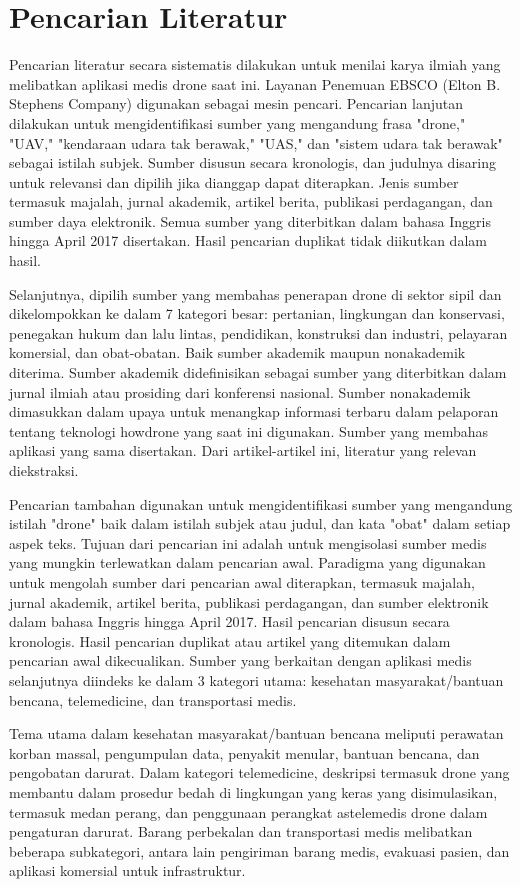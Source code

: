 \section{Pencarian Literatur}
\label{sec:pencarianliteratur}

Pencarian literatur secara sistematis dilakukan untuk menilai karya ilmiah yang melibatkan aplikasi medis drone saat ini. Layanan Penemuan EBSCO (Elton B. Stephens Company) digunakan sebagai mesin pencari. Pencarian lanjutan dilakukan untuk mengidentifikasi sumber yang mengandung frasa "drone," "UAV," "kendaraan udara tak berawak," "UAS," dan "sistem udara tak berawak" sebagai istilah subjek. Sumber disusun secara kronologis, dan judulnya disaring untuk relevansi dan dipilih jika dianggap dapat diterapkan. Jenis sumber termasuk majalah, jurnal akademik, artikel berita, publikasi perdagangan, dan sumber daya elektronik. Semua sumber yang diterbitkan dalam bahasa Inggris hingga April 2017 disertakan. Hasil pencarian duplikat tidak diikutkan dalam hasil.

Selanjutnya, dipilih sumber yang membahas penerapan drone di sektor sipil dan dikelompokkan ke dalam 7 kategori besar: pertanian, lingkungan dan konservasi, penegakan hukum dan lalu lintas, pendidikan, konstruksi dan industri, pelayaran komersial, dan obat-obatan. Baik sumber akademik maupun nonakademik diterima. Sumber akademik didefinisikan sebagai sumber yang diterbitkan dalam jurnal ilmiah atau prosiding dari konferensi nasional. Sumber nonakademik dimasukkan dalam upaya untuk menangkap informasi terbaru dalam pelaporan tentang teknologi howdrone yang saat ini digunakan. Sumber yang membahas aplikasi yang sama disertakan. Dari artikel-artikel ini, literatur yang relevan diekstraksi.

Pencarian tambahan digunakan untuk mengidentifikasi sumber yang mengandung istilah "drone" baik dalam istilah subjek atau judul, dan kata "obat" dalam setiap aspek teks. Tujuan dari pencarian ini adalah untuk mengisolasi sumber medis yang mungkin terlewatkan dalam pencarian awal. Paradigma yang digunakan untuk mengolah sumber dari pencarian awal diterapkan, termasuk majalah, jurnal akademik, artikel berita, publikasi perdagangan, dan sumber elektronik dalam bahasa Inggris hingga April 2017. Hasil pencarian disusun secara kronologis. Hasil pencarian duplikat atau artikel yang ditemukan dalam pencarian awal dikecualikan. Sumber yang berkaitan dengan aplikasi medis selanjutnya diindeks ke dalam 3 kategori utama: kesehatan masyarakat/bantuan bencana, telemedicine, dan transportasi medis.

Tema utama dalam kesehatan masyarakat/bantuan bencana meliputi perawatan korban massal, pengumpulan data, penyakit menular, bantuan bencana, dan pengobatan darurat. Dalam kategori telemedicine, deskripsi termasuk drone yang membantu dalam prosedur bedah di lingkungan yang keras yang disimulasikan, termasuk medan perang, dan penggunaan perangkat astelemedis drone dalam pengaturan darurat. Barang perbekalan dan transportasi medis melibatkan beberapa subkategori, antara lain pengiriman barang medis, evakuasi pasien, dan aplikasi komersial untuk infrastruktur.
